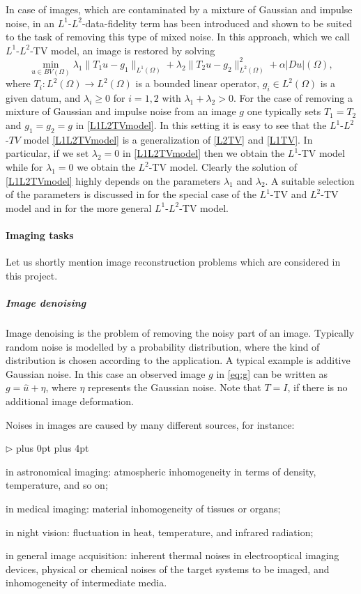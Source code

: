 \documentclass[enabledeprecatedfontcommands,cleardoublepage=empty,headsepline,twoside,11pt,DIV=15,BCOR=12mm,final]{scrartcl}
\renewenvironment{itemize}
{\begin{list}{$\triangleright$}{\labelwidth-2mm \leftmargin3mm %
  \itemsep5pt plus 0pt  \topsep3pt \parsep1pt plus 4pt \labelsep2mm}}
{\end{list}}
\begin{document}
In case of images, which are contaminated by a mixture of Gaussian and impulse noise, in \cite{HinLan2013} an $L^1$-$L^2$-data-fidelity term has been introduced and shown to be suited to the task of removing this type of mixed noise. In this approach, which we call $L^1$-$L^2$-TV model, an image is restored by solving
\begin{equation}\label{L1L2TVmodel}
\min_{u\in BV(\Omega)} \lambda_1 \|T_1u-g_1\|_{L^1(\Omega)} +  \lambda_2 \|T_2 u-g_2\|_{L^2(\Omega)}^2 + \alpha |Du|(\Omega),
\end{equation}
where $T_i : L^2(\Omega) \to L^2(\Omega)$ is a bounded linear operator, $g_i\in L^2(\Omega)$ is a given datum, and $\lambda_i\geq 0$ for $i=1,2$ with $\lambda_1+\lambda_2>0$. For the case of removing a mixture of Gaussian and impulse noise from an image $g$ one typically sets $T_1=T_2$ and $g_1=g_2=g$ in \eqref{L1L2TVmodel}. In this setting it is easy to see that the $L^1$-$L^2$-$TV$ model \eqref{L1L2TVmodel} is a generalization of \eqref{L2TV} and \eqref{L1TV}. In particular, if we set $\lambda_2=0$ in \eqref{L1L2TVmodel} then we obtain the $L^1$-TV model while for $\lambda_1=0$ we obtain the $L^2$-TV model. Clearly the solution of \eqref{L1L2TVmodel} highly depends on the parameters $\lambda_1$ and $\lambda_2$. A suitable selection of the parameters is discussed in \cite{Lan2015} for the special case of the $L^1$-TV and $L^2$-TV model and in \cite{Lan2016} for the more general $L^1$-$L^2$-TV model.

\paragraph{Imaging tasks}

Let us shortly mention image reconstruction problems which are considered in this project.

\subparagraph{Image denoising}

Image denoising is the problem of removing the noisy part of an image. Typically random noise is modelled by a probability distribution, where the kind of distribution is chosen according to the application. A typical example is additive Gaussian noise. In this case an observed image $g$ in \ref{eq:g} can be written as $g = \hat{u} + \eta$, where $\eta$ represents the Gaussian noise. Note that $T=I$, if there is no additional image deformation.

Noises in images are caused by many different sources, for instance:
\begin{itemize}
\item in astronomical imaging: atmospheric inhomogeneity in terms of density, temperature, and so on;
\item in medical imaging: material inhomogeneity of tissues or organs;
\item in night vision: fluctuation in heat, temperature, and infrared radiation;
\item in general image acquisition: inherent thermal noises in electrooptical imaging devices, physical or chemical noises of the target systems to be imaged, and inhomogeneity of intermediate media.
\end{itemize}
\end{document}

